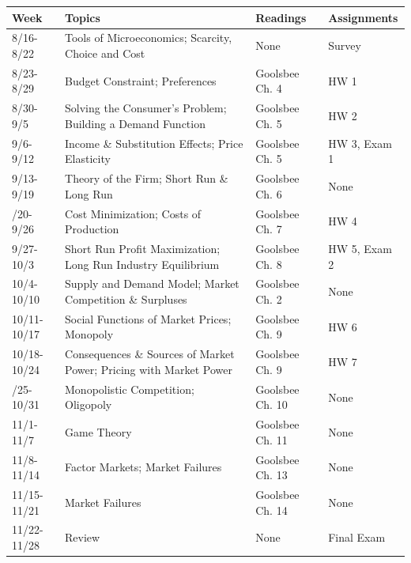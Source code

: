 \documentclass{article}
\begin{document}
\begin{center}
\small

\begin{tabular}{llll}
\toprule
Week & Topics & Readings & Assignments\\
\midrule
8/16-8/22 & Tools of Microeconomics; Scarcity, Choice and Cost & None & Survey\\
8/23-8/29 & Budget Constraint; Preferences & Goolsbee Ch. 4 & HW 1\\
8/30-9/5 & Solving the Consumer's Problem; Building a Demand Function & Goolsbee Ch. 5 & HW 2\\
9/6-9/12 & Income \& Substitution Effects; Price Elasticity & Goolsbee Ch. 5 & HW 3, Exam 1\\
9/13-9/19 & Theory of the Firm; Short Run \& Long Run & Goolsbee Ch. 6 & None\\
\addlinespace
9/20-9/26 & Cost Minimization; Costs of Production & Goolsbee Ch. 7 & HW 4\\
9/27-10/3 & Short Run Profit Maximization; Long Run Industry Equilibrium & Goolsbee Ch. 8 & HW 5, Exam 2\\
10/4-10/10 & Supply and Demand Model; Market Competition \& Surpluses & Goolsbee Ch. 2 & None\\
10/11-10/17 & Social Functions of Market Prices; Monopoly & Goolsbee Ch. 9 & HW 6\\
10/18-10/24 & Consequences \& Sources of Market Power; Pricing with Market Power & Goolsbee Ch. 9 & HW 7\\
\addlinespace
10/25-10/31 & Monopolistic Competition; Oligopoly & Goolsbee Ch. 10 & None\\
11/1-11/7 & Game Theory & Goolsbee Ch. 11 & None\\
11/8-11/14 & Factor Markets; Market Failures & Goolsbee Ch. 13 & None\\
11/15-11/21 & Market Failures & Goolsbee Ch. 14 & None\\
11/22-11/28 & Review & None & Final Exam\\
\bottomrule
\end{tabular}
\end{center}
\end{document}
